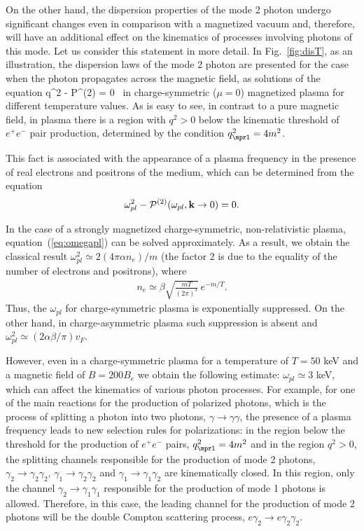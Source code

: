 \documentclass[
aps,%
12pt,%
final,%
notitlepage,%
oneside,%
onecolumn,%
nobibnotes,%
nofootinbib,%
superscriptaddress,%
noshowpacs,%
centertags]%
{revtex4}
\begin{document}
On the other hand, the dispersion properties of the mode 2 photon undergo significant changes even
in comparison with a magnetized vacuum and, therefore, will have an additional effect
on the kinematics of processes involving photons of this mode. Let us consider this statement in more detail.
In Fig.~\ref{fig:disT}, as an illustration, the dispersion laws of the mode 2 photon are presented 
for the case when the photon propagates across the magnetic field,
as solutions of the equation
%
\beq
q^2 - {\cal P}^{(2)} = 0 \, 
\label{disper}
\eeq
\noindent in charge-symmetric ($\mu=0$) magnetized plasma for different temperature values.
As is easy to see, in contrast to a pure magnetic field, in plasma there is a region with $q^2 > 0$ 
below the kinematic threshold of $e^+e^-$ pair production, determined by the condition $q^2_{\mprl} = 4 m^2$.

This fact is associated with the appearance of a plasma frequency in the presence of real electrons and 
positrons of the medium, which can be determined from the equation
%
\begin{equation}
\omega_{pl}^2 - {\cal P}^{(2)} (\omega_{pl}, {\mathbf k} \to 0 ) = 0.
\label{eq:omegapl}
\end{equation}

In the case of a strongly magnetized charge-symmetric, non-relativistic plasma, equation~(\ref{eq:omegapl}) 
can be solved approximately. As a result, we obtain the classical result 
$\omega_{pl}^2 \simeq 2(4\pi \alpha n_{e})/m$ (the factor 2 is due to the equality of 
the number of electrons and positrons), where
%
\begin{eqnarray}
n_{e} \simeq \beta \sqrt{\frac{mT}{(2\pi)^3}}\,e^{-m/T}.
\label{eq:ne}
\end{eqnarray}
\noindent Thus, the $\omega_{pl}$ for charge-symmetric plasma is exponentially suppressed.
 On the other hand, in charge-asymmetric plasma such suppression is absent and
$\omega_{pl}^2 \simeq (2\alpha \beta/\pi)v_F$.

However, even in a charge-symmetric plasma for a temperature of $T=50$ keV and a magnetic 
field of $B=200 B_e$ we obtain the following estimate: $\omega_{pl} \simeq 3$ keV, which can affect 
the kinematics of various photon processes.
For example, for one of the main reactions for the production of polarized photons, which is the process 
of splitting a photon into two photons, $\gamma \to \gamma \gamma$, the presence of a plasma frequency 
leads to new selection rules for polarizations: in the region below the threshold for the production of
$e^+e^-$ pairs, $q^2_{\mprl} = 4 m^2$ and in the region $q^2 > 0$, the splitting channels responsible 
for the production of mode 2 photons,
$\gamma_2 \to \gamma_2 \gamma_2$,
$\gamma_1 \to \gamma_2 \gamma_2$ and $\gamma_1 \to \gamma_1 \gamma_2$ are kinematically closed. 
In this region, only the channel $\gamma_2 \to \gamma_1 \gamma_1$
responsible for the production of mode 1 photons is allowed. Therefore, in this case, the leading 
channel for the production of mode 2 photons will be the double Compton scattering process, 
$e \gamma_2 \to e \gamma_2 \gamma_2$.
\end{document}
